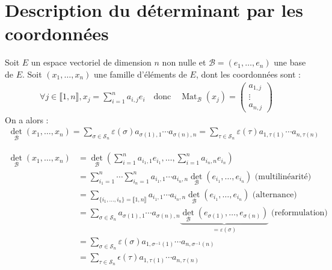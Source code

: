 \documentclass[../main.tex]{subfiles}
\begin{document}
\section{Description du déterminant par les coordonnées}
\begin{tcolorbox}[title=Théorème 30.26, title filled=false, colframe=orange, colback=orange!10!white]
    Soit $E$ un espace vectoriel de dimension $n$ non nulle et $\mathcal{B} = (e_1, \ldots, e_n)$ une base de $E$. Soit $(x_1, \ldots, x_n)$ une famille d'éléments de $E$, dont les coordonnées sont : 
    \begin{align*}
        \forall j\in \llbracket 1, n \rrbracket, x_j = \sum_{i=1}^{n} a_{i, j} e_i \quad \text{donc} \quad \operatorname{Mat}_{\mathcal{B}}(x_j) = \begin{pmatrix}
            a_{1, j} \\
            \vdots \\
            a_{n, j}
        \end{pmatrix}
    \end{align*}
    On a alors : 
    \begin{align*}
        \underset{\mathcal{B}}{\operatorname{det}}(x_1, \ldots, x_n) = \sum_{\sigma\in \mathcal{S}_n} \varepsilon(\sigma) a_{\sigma(1), 1} \cdots a_{\sigma(n), n} = \sum_{\tau\in \mathcal{S}_n} \varepsilon(\tau) a_{1, \tau(1)} \cdots a_{n, \tau(n)}
    \end{align*}
\end{tcolorbox}

\begin{align*}
    \operatorname{det}_{\mathcal{B}}(x_1, \ldots, x_n) &= \operatorname{det}_{\mathcal{B}} \left( \sum_{i=1}^{n} a_{i_1, 1} e_{i_1}, \ldots, \sum_{i=1}^{n} a_{i_n, n} e_{i_n} \right) \\
    &= \sum_{i_1=1}^{n} \cdots \sum_{i_n=1}^{n} a_{i_1, 1} \cdots a_{i_n, n} \operatorname{det}_{\mathcal{B}}(e_{i_1}, \ldots, e_{i_n}) \text{ (multilinéarité)} \\
    &= \sum_{\{i_1, \ldots, i_n\} = \llbracket 1, n \rrbracket} a_{i_1, 1} \cdots a_{i_n, n} \operatorname{det}_{\mathcal{B}}(e_{i_1}, \ldots, e_{i_n}) \text{ (alternance)} \\
    &= \sum_{\sigma\in \mathcal{S}_n} a_{\sigma(1), 1} \cdots a_{\sigma(n), n} \underbrace{\operatorname{det}_{\mathcal{B}}(e_{\sigma(1)}, \ldots, e_{\sigma(n)})}_{= \varepsilon(\sigma)} \text{ (reformulation)} \\
    &= \sum_{\sigma\in \mathcal{S}_n} \varepsilon(\sigma) a_{1, \sigma^{-1}(1)} \cdots a_{n, \sigma^{-1}(n)} \\
    &= \sum_{\tau\in \mathcal{S}_n} \epsilon(\tau) a_{1, \tau(1)} \cdots a_{n, \tau(n)}
\end{align*}
\end{document}
